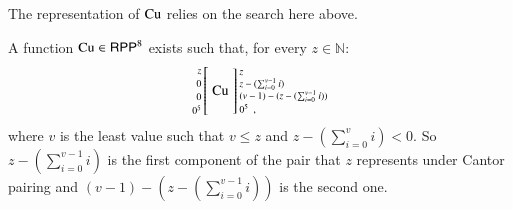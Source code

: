 \noindent
The representation of $ \operatorname{Cu} $ relies on the search here above.

\begin{theorem}
\label{lemma:Representing CU in RPP}
A function $ \operatorname{Cu}\in\mathsf{RPP}^{8}$ exists such that, for every $ z \in\mathbb{N}$:
\begin{align*}
\arraycolsep=1.4pt
\begin{array}{rcl}
 \left. {\scriptsize \begin{array}{r} 
                       z\\[0.5mm] 0\\[0.5mm] 0\\[0.5mm] 
                        0^{5
                       	}
                     \end{array}} \right[
 & \CU &
 \left] {\scriptsize \begin{array}{l}
                       z\\ z-(\sum^{v-1}_{i=0} i ) \\ (v-1)-(z-(\sum^{v-1}_{i=0} i)) \\[0.5mm]
                       0^{5
                         }
                     \enspace ,
                     \end{array} } \right.
\end{array}
\end{align*}
where $ v $ is the least value such that $ v \leq z $ and $ z-(\sum^{v}_{i=0} i ) < 0$. 
So $ z-(\sum^{v-1}_{i=0} i ) $ is the first component of the pair that $ z $ represents under Cantor pairing
and $ (v-1)-(z-(\sum^{v-1}_{i=0} i)) $ is the second one.
\end{theorem}
